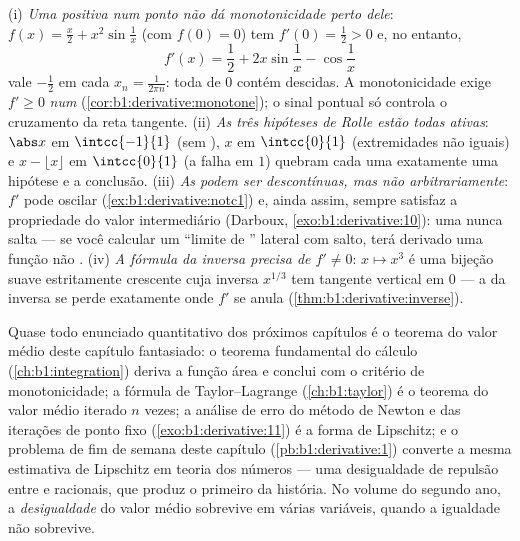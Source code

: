\begin{remark}
(i) \emph{Uma  positiva num ponto não dá
monotonicidade perto dele}: $f(x) = \frac x2 + x^2\sin\frac1x$ (com
$f(0) = 0$) tem $f'(0) = \frac12 > 0$ e, no entanto,
\[
f'(x) = \frac12 + 2x\sin\frac1x - \cos\frac1x
\]
vale $-\frac12$ em cada $x_n = \frac{1}{2\pi n}$: toda
 de $0$ contém descidas. A monotonicidade exige $f'
\geq 0$ \emph{num }
(\cref{cor:b1:derivative:monotone}); o sinal pontual só
controla o cruzamento da reta tangente. (ii) \emph{As três hipóteses de
Rolle estão todas ativas}: $\abs x$ em $\intcc{-1}{1}$
(sem  ), $x$ em $\intcc{0}{1}$ (extremidades não
iguais) e $x - \lfloor x\rfloor$ em $\intcc{0}{1}$ (a 
falha em $1$) quebram cada uma exatamente uma hipótese e a
conclusão. (iii) \emph{As  podem ser descontínuas, mas
não arbitrariamente}: $f'$ pode oscilar
(\cref{ex:b1:derivative:notc1}) e, ainda assim, sempre satisfaz a
propriedade do valor intermediário (Darboux,
\cref{exo:b1:derivative:10}): uma  nunca salta --- se
você calcular um ``limite de '' lateral com salto, terá
derivado uma função não . (iv) \emph{A fórmula da
inversa precisa de $f' \neq 0$}: $x \mapsto x^3$ é uma bijeção suave
estritamente crescente cuja inversa $x^{1/3}$ tem
tangente vertical em $0$ --- a  da inversa se
perde exatamente onde $f'$ se anula
(\cref{thm:b1:derivative:inverse}).
\end{remark}

\begin{remark}
Quase todo enunciado quantitativo dos próximos capítulos é o
teorema do valor médio deste capítulo fantasiado: o teorema fundamental
do cálculo (\cref{ch:b1:integration}) deriva a função área
e conclui com o critério de monotonicidade; a fórmula de
Taylor--Lagrange (\cref{ch:b1:taylor}) é o teorema do valor
médio iterado $n$ vezes; a análise de erro do método de Newton
e das iterações de ponto fixo (\cref{exo:b1:derivative:11}) é
a forma de Lipschitz; e o problema de fim de semana deste capítulo
(\cref{pb:b1:derivative:1}) converte a mesma estimativa de Lipschitz em
teoria dos números --- uma desigualdade de repulsão entre  e racionais, que produz o primeiro 
da história. No volume do segundo ano, a \emph{desigualdade} do valor
médio sobrevive em várias variáveis, quando a igualdade não
sobrevive.
\end{remark}

